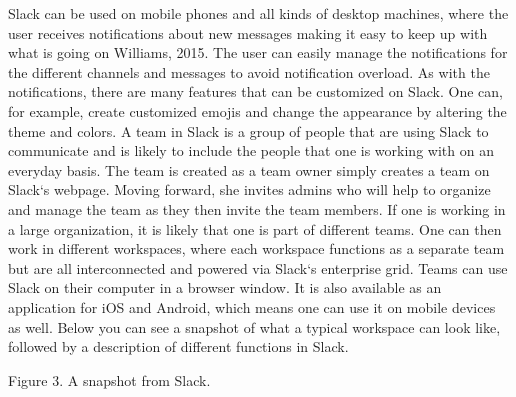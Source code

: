 Slack can be used on mobile phones and all kinds of desktop machines, where the user receives notifications about new messages making it easy to keep up with what is going on Williams, 2015. The user can easily manage the notifications for the different channels and messages to avoid notification overload. As with the notifications, there are many features that can be customized on Slack. One can, for example, create customized emojis and change the appearance by altering the theme and colors.
A team in Slack is a group of people that are using Slack to communicate and is likely to include the people that one is working with on an everyday basis. The team is created as a team owner simply creates a team on Slack‘s webpage. Moving forward, she invites admins who will help to organize and manage the team as they then invite the team members. If one is working in a large organization, it is likely that one is part of different teams. One can then work in different workspaces, where each workspace functions as a separate team but are all interconnected and powered via Slack‘s enterprise grid. Teams can use Slack on their computer in a browser window. It is also available as an application for iOS and Android, which means one can use it on mobile devices as well.
Below you can see a snapshot of what a typical workspace can look like, followed by a description of different functions in Slack.

Figure 3. A snapshot from Slack. 

